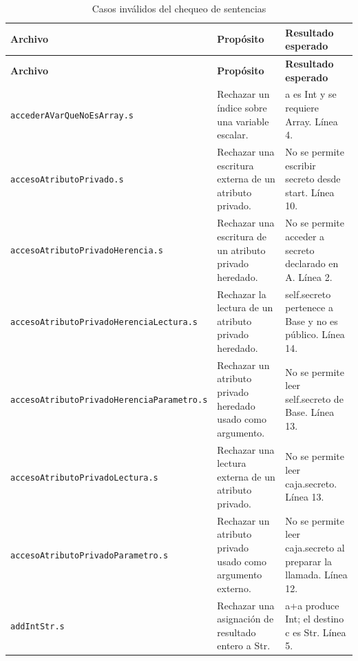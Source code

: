 \begingroup
\small
\renewcommand{\arraystretch}{1.2}
\setlength{\tabcolsep}{5pt}
\setlength{\LTleft}{0pt}
\setlength{\LTright}{0pt}
\begin{longtable}{|>{\raggedright\arraybackslash}p{}|>{\raggedright\arraybackslash}p{}|>{\raggedright\arraybackslash}p{}|}
\caption{Casos inválidos del chequeo de sentencias}\label{tab:sentencias-error}\\
\hline
\textbf{Archivo} & \textbf{Propósito} & \textbf{Resultado esperado} \\ \hline
\endfirsthead
\hline
\textbf{Archivo} & \textbf{Propósito} & \textbf{Resultado esperado} \\ \hline
\endhead
\texttt{acceder\allowbreak AVar\allowbreak Que\allowbreak No\allowbreak Es\allowbreak Array.s} & Rechazar un índice sobre una variable escalar. & a es Int y se requiere Array. Línea 4. \\ \hline
\texttt{acceso\allowbreak Atributo\allowbreak Privado.s} & Rechazar una escritura externa de un atributo privado. & No se permite escribir secreto desde start. Línea 10. \\ \hline
\texttt{acceso\allowbreak Atributo\allowbreak Privado\allowbreak Herencia.s} & Rechazar una escritura de un atributo privado heredado. & No se permite acceder a secreto declarado en A. Línea 2. \\ \hline
\texttt{acceso\allowbreak Atributo\allowbreak Privado\allowbreak Herencia\allowbreak Lectura.s} & Rechazar la lectura de un atributo privado heredado. & self.secreto pertenece a Base y no es público. Línea 14. \\ \hline
\texttt{acceso\allowbreak Atributo\allowbreak Privado\allowbreak Herencia\allowbreak Parametro.s} & Rechazar un atributo privado heredado usado como argumento. & No se permite leer self.secreto de Base. Línea 13. \\ \hline
\texttt{acceso\allowbreak Atributo\allowbreak Privado\allowbreak Lectura.s} & Rechazar una lectura externa de un atributo privado. & No se permite leer caja.secreto. Línea 13. \\ \hline
\texttt{acceso\allowbreak Atributo\allowbreak Privado\allowbreak Parametro.s} & Rechazar un atributo privado usado como argumento externo. & No se permite leer caja.secreto al preparar la llamada. Línea 12. \\ \hline
\texttt{add\allowbreak Int\allowbreak Str.s} & Rechazar una asignación de resultado entero a Str. & a+a produce Int; el destino c es Str. Línea 5. \\ \hline

\end{longtable}
